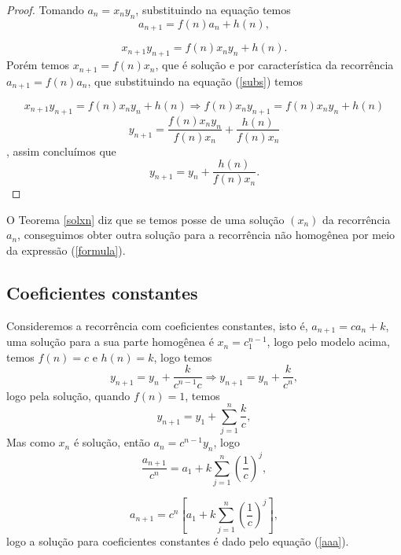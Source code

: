  	\begin{proof}
 		Tomando $a_n = x_ny_n$, substituindo na equação temos
 		$$a_{n+1}=f(n)a_n + h(n),$$
 		
 		\begin{equation}
 		\label{subs}	x_{n+1}y_{n+1}=f(n)x_ny_n + h(n).
 		\end{equation}
 	\inic  Porém temos $x_{n+1} =f(n)x_n$, que é solução e por característica da recorrência $a_{n+1}=f(n)a_n$, que substituindo na equação (\ref{subs}) temos
 		
 	\begin{equation}
 		\label{subs1}
 		x_{n+1}y_{n+1}=f(n)x_ny_n + h(n) \Rightarrow f(n)x_ny_{n+1} = f(n)x_ny_n+h(n) 
 		\end{equation}
 		$$y_{n+1} = \frac{f(n)x_ny_n}{f(n)x_n} + \frac{h(n)}{f(n)x_n}$$,
 		 assim concluímos que
 		 \begin{equation}
 		 	y_{n+1} = y_n + \frac{h(n)}{f(n)x_n}.
 		 \end{equation}
 	\end{proof}
 	O Teorema \ref{solxn} diz que se temos posse de uma solução $(x_n)$ da recorrência $a_n$, conseguimos obter outra solução para a recorrência não homogênea por meio da expressão (\ref{formula}).
 	
 	\subsection{Coeficientes constantes} 
 	
 	\quad Consideremos a recorrência com coeficientes constantes, isto é, $a_{n+1} = ca_n + k$, uma solução para a sua parte homogênea é $x_n = c_1^{n-1}$, logo pelo modelo acima, temos $f(n) =c$ e $h(n) = k$, logo temos
 	\begin{equation}
 		y_{n+1} = y_n + \frac{k}{c^{n-1}c} \Rightarrow y_{n+1}=y_n + \frac{k}{c^n},
 	\end{equation}
 	logo pela solução, quando $f(n)=1$, temos
 	\begin{equation}
 		y_{n+1} = y_1 + \sum_{j=1}^{n}\frac{k}{c},
 	\end{equation}
 	Mas como $x_n$ é solução, então $a_n = c^{n-1}y_n$, logo
 	$$ \frac{a_{n+1}}{c^n} = a_1 + k \sum_{j=1}^{n}\left(\frac{1}{c}\right)^j, $$
 	 
 	 \begin{equation}
 	 \label{aaa}
 	 	a_{n+1} = c^n\left[a_1 + k \sum_{j=1}^{n}\left(\frac{1}{c}\right)^j\right],
 	 \end{equation}
 	 logo a solução para coeficientes constantes é dado pelo equação (\ref{aaa}).\\
 	 

